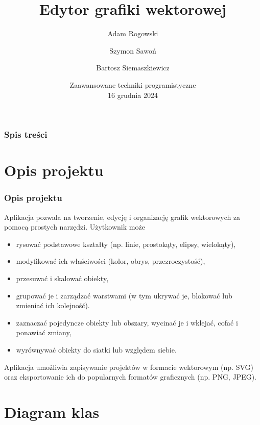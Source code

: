 \documentclass[
	11pt,]{beamer}
\title[VecEdit]{Edytor grafiki wektorowej} \subtitle{}
\author[]{Adam Rogowski \and Szymon Sawoń \and Bartosz Siemaszkiewicz}
\date[16 grudnia 2024]{Zaawansowane techniki programistyczne \\ 16 grudnia 2024}
\begin{document}

\begin{frame}
	\titlepage 
\end{frame}

\begin{frame}
	\frametitle{Spis treści}
	\tableofcontents 
\end{frame}


\section{Opis projektu} 

\begin{frame}
	\frametitle{Opis projektu}
	
	Aplikacja pozwala na tworzenie, edycję i organizację grafik wektorowych za pomocą prostych narzędzi. Użytkownik może
	\begin{itemize}
		\item rysować podstawowe kształty (np. linie, prostokąty, elipsy, wielokąty),
		\item modyfikować ich właściwości (kolor, obrys, przezroczystość),
		\item przesuwać i skalować obiekty,
		\item grupować je i zarządzać warstwami (w tym ukrywać je, blokować lub zmieniać ich kolejność).
		\item zaznaczać pojedyncze obiekty lub obszary, wycinać je i wklejać, cofać i ponawiać zmiany, 
		\item wyrównywać obiekty do siatki lub względem siebie. 

	\end{itemize}

Aplikacja umożliwia zapisywanie projektów w formacie wektorowym (np. SVG) oraz eksportowanie ich do popularnych formatów graficznych (np. PNG, JPEG).

	\end{frame}


\section{Diagram klas}
\end{document}

